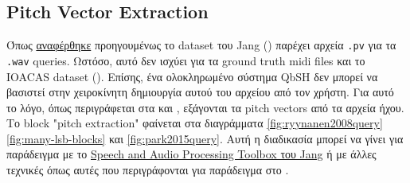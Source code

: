 \subsection{Pitch Vector Extraction}
Όπως \hyperref[item:pitch-vector]{αναφέρθηκε} προηγουμένως το dataset του Jang (\cite{jang-dataset})
παρέχει αρχεία \texttt{.pv} για τα \texttt{.wav} queries.
Ωστόσο, αυτό δεν ισχύει για τα ground truth midi files και το IOACAS dataset (\cite{IOACAS-dataset}).
Επίσης, ένα ολοκληρωμένο σύστημα QbSH δεν μπορεί να βασιστεί στην χειροκίνητη δημιουργία αυτού του αρχείου από τον χρήστη.
Για αυτό το λόγο, όπως περιγράφεται στα
\cite{ryynanen2008query, guo2012query, wang2012query, guo2013query, park2015query}
και \cite[Chapter~7]{jang2011audio},
εξάγονται τα pitch vectors από τα αρχεία ήχου.
Το block "pitch extraction" φαίνεται στα διαγράμματα
\hyperref[fig:ryynanen2008query]{\ref{fig:ryynanen2008query}}
\hyperref[fig:many-lsb-blocks]{\ref{fig:many-lsb-blocks}}
και \hyperref[fig:park2015query]{\ref{fig:park2015query}}.
Αυτή η διαδικασία μπορεί να γίνει για παράδειγμα με το
\label{pve:SAP}\href{http://mirlab.org/jang/matlab/toolbox/sap/}{Speech and Audio Processing Toolbox του Jang}
ή με άλλες τεχνικές όπως αυτές που περιγράφονται για παράδειγμα στο \cite{ryynanen2008query}.
